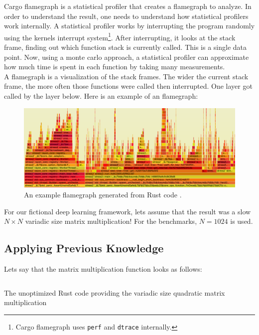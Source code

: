 Cargo flamegraph \cite{flamegraph} is a statistical profiler that creates a flamegraph to analyze. In order to understand the result, one needs to understand how statistical profilers work internally.
A statistical profiler works by interrupting the program randomly using the kernels interrupt system\footnote{Cargo flamegraph uses \texttt{perf} and \texttt{dtrace} internally.}. After interrupting, it looks at the stack frame, finding out which function stack is currently called. This is a single data point. Now, using a monte carlo approach, a statistical profiler can approximate how much time is spent in each function by taking many measurements.\\

A flamegraph is a visualization of the stack frames. The wider the current stack frame, the more often those functions were called then interrupted. One layer got called by the layer below. Here is an example of an flamegraph:

\begin{figure}[H]
  \centering
  \includegraphics[width=\textwidth]{./assets/exampleflamegraph}
  \caption{An example flamegraph generated from Rust code \cite{flamegraph}.}
\end{figure}

For our fictional deep learning framework, lets assume that the result was a slow $N \times N$ variadic size matrix multiplication! For the benchmarks, $N=1024$ is used.

\subsection{Applying Previous Knowledge}
Lets say that the matrix multiplication function looks as follows:

\begin{listing}[H]
  \inputminted{rust}{./assets/variadic_unoptimized.rs}
\caption{The unoptimized Rust code providing the variadic size quadratic matrix multiplication}
\end{listing}

